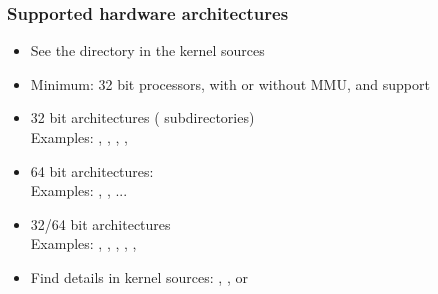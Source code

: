 \begin{frame}
  \frametitle{Supported hardware architectures}
  \begin{itemize}
  \item See the  directory in the kernel sources
  \item Minimum: 32 bit processors, with or without MMU, and
     support
  \item 32 bit architectures ( subdirectories)\\
    Examples: , ,
    , , 
  \item 64 bit architectures:\\
    Examples: , , ...
  \item 32/64 bit architectures\\
    Examples: , , , ,
              , 
  \item Find details in kernel sources: ,
    , or 
  \end{itemize}
\end{frame}
